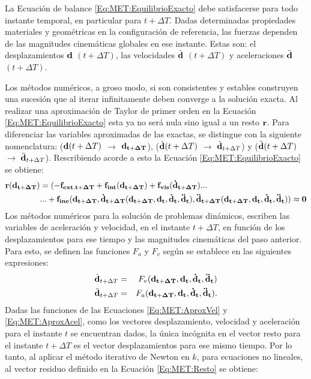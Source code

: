 La Ecuación de balance \eqref{Eq:MET:EquilibrioExacto} debe satisfacerse para todo instante temporal, en particular para $t+\Delta T$. Dadas determinadas propiedades materiales y geométricas en la configuración de referencia, las fuerzas dependen de las magnitudes cinemáticas globales en ese instante. Estas son: el desplazamientos $\bf{d}$ $(t+\Delta T)$, las velocidades $\dot{\bf{d}}$ $(t+\Delta T)$ y aceleraciones $\ddot{\bf{d}}$ $(t+\Delta T)$.

Los métodos numéricos, a groso modo, si son consistentes y estables construyen una sucesión que al iterar infinitamente deben converge a la solución exacta. Al realizar una aproximación de Taylor de primer orden en la Ecuación \eqref{Eq:MET:EquilibrioExacto} esta ya no será nula sino igual a un resto $\bf{r}$. Para diferenciar las variables aproximadas de las exactas, se distingue con la siguiente nomenclatura: ($\bf{d}\text{$(t+\Delta T)$}$ $\rightarrow$ $\bf{d}_{t+\Delta T}$), ($\dot{\bf{d}}\text{$(t+\Delta T)$}$ $\rightarrow$ $\dot{\bf{d}}_{t+\Delta T}$) y ($\ddot{\bf{d}}\text{$(t+\Delta T)$}$ $\rightarrow$ $\ddot{\bf{d}}_{t+\Delta T}$). Rescribiendo acorde a esto la Ecuación \eqref{Eq:MET:EquilibrioExacto} se obtiene:
\begin{equation}\label{Eq:MET:Resto}
	\begin{split}
		\bf{r}(\bf{d}_{t+\Delta T})&=(-\bf{f}_{ext,t+\Delta T}+\bf{f}_{int}(\bf{d}_{t+\Delta T})+\bf{f}_{vis}(\dot{\bf{d}}_{t+\Delta T})...\\	
		&...+\bf{f}_{ine}(\bf{d_{t+\Delta T}},\dot{\bf{d}}_{t+\Delta T}(d_{t+\Delta T},\bf{d_t},\bf{\dot{d}_t},\bf{\ddot{d}_t}),
		\ddot{\bf{d}}_{t+\Delta T}(d_{t+\Delta T},\bf{d_t},\bf{\dot{d}_t},\bf{\ddot{d}_t}))
		\approx 0
	\end{split}
\end{equation}
Los métodos numéricos para la solución de problemas dinámicos, escriben las variables de aceleración y velocidad, en el instante $t +\Delta T$, en función de los desplazamientos para ese tiempo y las magnitudes cinemáticas del paso anterior. Para esto, se definen las funciones $F_a$ y $F_v$ según se establece en las siguientes expresiones:
\begin{eqnarray}\label{Eq:MET:AproxVel}
	\dot{\bf{d}}_{t+\Delta T}&=&F_v(\bf{d_{t+\Delta T}},\bf{d_t},\bf{\dot{d}_t},\bf{\ddot{d}_t})\\
	\label{Eq:MET:AproxAcel}
	\ddot{\bf{d}}_{t+\Delta T}&=&F_a(\bf{d_{t+\Delta T}},\bf{d_t},\bf{\dot{d}_t},\bf{\ddot{d}_t}).
\end{eqnarray}
Dadas las funciones de las Ecuaciones \eqref{Eq:MET:AproxVel} y \eqref{Eq:MET:AproxAcel}, como los vectores desplazamiento, velocidad y aceleración para el instante $t$ se encuentran dados, la única incógnita en el vector resto para el instante $t+\Delta T$ es el vector desplazamientos para ese mismo tiempo. Por lo tanto, al aplicar el método iterativo de Newton en $k$, para ecuaciones no lineales, al vector residuo definido en la Ecuación \eqref{Eq:MET:Resto} se obtiene:

